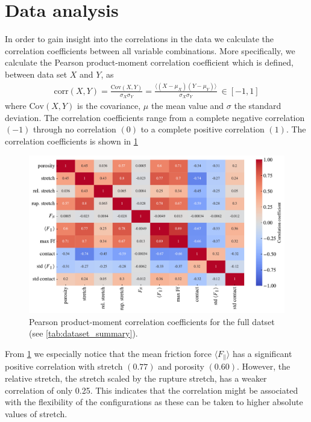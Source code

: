 \section{Data analysis}
In order to gain insight into the correlations in the data we calculate the correlation coefficients between all variable combinations. More specifically, we calculate the Pearson product-moment correlation coefficient which is defined, between data set $X$ and $Y$, as
\begin{align*}
  \mathrm{corr}(X,Y) = \frac{\mathrm{Cov}(X,Y)}{\sigma_X \sigma_Y} = \frac{\langle (X - \mu_X)(Y - \mu_Y)\rangle}{\sigma_X \sigma_Y} \ \in [-1, 1]
\end{align*}
where $\mathrm{Cov}(X,Y)$ is the covariance, $\mu$ the mean value and $\sigma$ the standard deviation. The correlation coefficients range from a complete negative correlation $(-1)$ through no correlation $(0)$ to a complete positive correlation $(1)$. The correlation coefficients is shown in \cref{fig:corrcoef_matrix}
\begin{figure}[H]
  \centering
  \includegraphics[width=\linewidth]{figures/ML/corrcoef_matrix.pdf}
  \caption{Pearson product-moment correlation coefficients for the full datset (see \cref{tab:dataset_summary}).}
  \label{fig:corrcoef_matrix}
\end{figure}
From \cref{fig:corrcoef_matrix} we especially notice that the mean friction
force $\langle F_{\parallel} \rangle$ has a significant positive correlation
with stretch $(0.77)$ and porosity $(0.60)$. However, the relative stretch, the
stretch scaled by the rupture stretch, has a weaker correlation of only 0.25.
This indicates that the correlation might be associated with the flexibility of
the configurations as these can be taken to higher absolute values of stretch.
